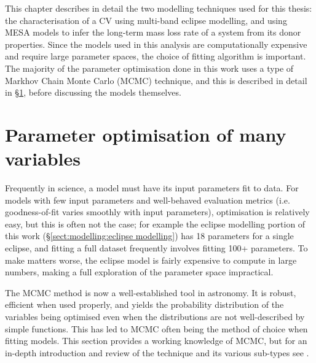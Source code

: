 \label{chpt:modelling and techniques}

This chapter describes in detail the two modelling techniques used for this thesis: the characterisation of a CV using multi-band eclipse modelling, and using MESA models to infer the long-term mass loss rate of a system from its donor properties.
Since the models used in this analysis are computationally expensive and require large parameter spaces, the choice of fitting algorithm is important. The majority of the parameter optimisation done in this work uses a type of Markhov Chain Monte Carlo (MCMC) technique, and this is described in detail in \S\ref{sect:modelling:parameter optimisation of many variables}, before discussing the models themselves.


\section{Parameter optimisation of many variables}
\label{sect:modelling:parameter optimisation of many variables}
Frequently in science, a model must have its input parameters fit to data. For models with few input parameters and well-behaved evaluation metrics (i.e. goodness-of-fit varies smoothly with input parameters), optimisation is relatively easy, but this is often not the case; for example the eclipse modelling portion of this work (\S\ref{sect:modelling:eclipse modelling}) has 18 parameters for a single eclipse, and fitting a full dataset frequently involves fitting  100+ parameters. To make matters worse, the eclipse model is fairly expensive to compute in large numbers, making a full exploration of the parameter space impractical.

The MCMC method is now a well-established tool in astronomy. It is robust, efficient when used properly, and yields the probability distribution of the variables being optimised even when the distributions are not well-described by simple functions. This has led to MCMC often being the method of choice when fitting models.
This section provides a working knowledge of MCMC, but for an in-depth introduction and review of the technique and its various sub-types see \citet{sharma2017}.


